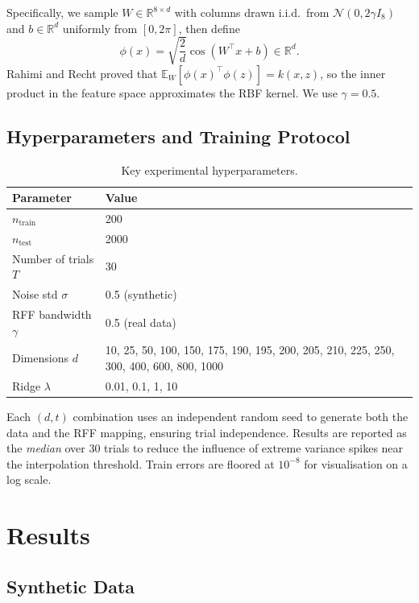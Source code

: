 \documentclass[11pt,a4paper]{article}
\begin{document}
Specifically, we sample $W \in \mathbb{R}^{8 \times d}$ with columns drawn i.i.d.\ from
$\mathcal{N}(0, 2\gamma I_8)$ and $b \in \mathbb{R}^d$ uniformly from $[0, 2\pi]$, then define
\[
  \phi(x) = \sqrt{\frac{2}{d}}\cos(W^\top x + b) \in \mathbb{R}^d.
\]
Rahimi and Recht \cite{rahimi2007random} proved that
$\mathbb{E}_W[\phi(x)^\top\phi(z)] = k(x, z)$, so the inner product in the feature space
approximates the RBF kernel.
We use $\gamma = 0.5$.

\subsection{Hyperparameters and Training Protocol}

\begin{table}[H]
\centering
\caption{Key experimental hyperparameters.}
\begin{tabular}{ll}
\toprule
Parameter & Value \\
\midrule
$n_{\mathrm{train}}$ & 200 \\
$n_{\mathrm{test}}$  & 2000 \\
Number of trials $T$ & 30 \\
Noise std $\sigma$   & 0.5 (synthetic) \\
RFF bandwidth $\gamma$ & 0.5 (real data) \\
Dimensions $d$       & 10, 25, 50, 100, 150, 175, 190, 195, 200, 205, 210, 225, 250, 300, 400, 600, 800, 1000 \\
Ridge $\lambda$      & 0.01, 0.1, 1, 10 \\
\bottomrule
\end{tabular}
\label{tab:hyperparams}
\end{table}

Each $(d, t)$ combination uses an independent random seed to generate both the data and the RFF
mapping, ensuring trial independence.
Results are reported as the \emph{median} over 30 trials to reduce the influence of extreme
variance spikes near the interpolation threshold.
Train errors are floored at $10^{-8}$ for visualisation on a log scale.


\section{Results}
\label{sec:results}

\subsection{Synthetic Data}
\end{document}
